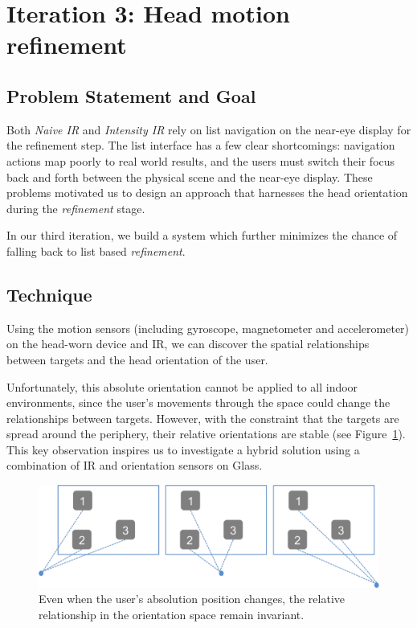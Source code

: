 \section{Iteration 3: Head motion refinement}
\label{sec:iteration-3:-head}
\subsection{Problem Statement and Goal}
Both {\em Naive IR} and {\em Intensity IR} rely on list navigation on the
near-eye display for the refinement step. The list interface has a few clear shortcomings: navigation actions map poorly to real world results, and the users must switch their focus back and forth between the physical scene and the near-eye display. These problems motivated us to design an approach that harnesses the head orientation during the {\em refinement} stage.

In our third iteration, we build a system which further minimizes the chance of
falling back to list based {\em refinement}.

\subsection{Technique}
Using the motion sensors (including gyroscope, magnetometer and accelerometer) on the
head-worn device and IR, we can discover the spatial relationships between targets and the head orientation of the user.  

Unfortunately, this absolute orientation cannot be applied to all indoor
environments, since the user’s movements through the space could change the relationships between targets. However, with the constraint that the targets are spread around the periphery, their relative orientations are stable
(see Figure~\ref{fig:third_principle}). This key observation inspires us to
investigate a hybrid solution using a combination of IR and orientation sensors on Glass.

\begin{figure}[t]
\centering
\includegraphics[width=1\columnwidth]{figures/third_principle.png}
\caption{Even when the user's absolution position changes, the relative relationship in the orientation space remain invariant.}
\label{fig:third_principle}
\end{figure}

